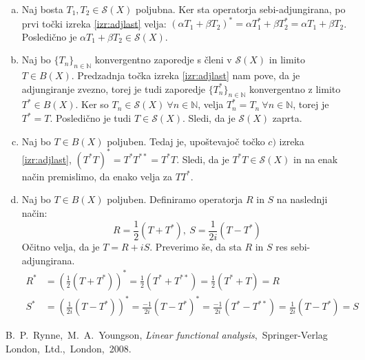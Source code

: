 \documentclass[mat2]{matdelo}
\newcommand{\N}{\mathbb{N}}
\begin{document}
			\begin{dokaz}
				\begin{enumerate}[a)]
					\item Naj bosta $T_1, T_2 \in \mathcal{S}(X)$ poljubna. Ker sta operatorja sebi-adjungirana, po prvi točki izreka \ref{izr:adjlast} velja: $(\alpha T_1 + \beta T_2)^* = \alpha T_1^* + \beta T_2^* = \alpha T_1 + \beta T_2$. Posledično je $\alpha T_1 + \beta T_2 \in \mathcal{S}(X)$.
					\item Naj bo $\{T_n\}_{n\in\N}$ konvergentno zaporedje s členi v $\mathcal{S}(X)$ in limito $T\in B(X)$. Predzadnja točka izreka \ref{izr:adjlast} nam pove, da je adjungiranje zvezno, torej je tudi zaporedje $\{T_n^*\}_{n\in\N}$ konvergentno z limito $T^* \in B(X)$. Ker so $T_n \in \mathcal{S}(X)~ \forall n\in \N$, velja $T_n^* = T_n~\forall n\in \N$, torej je $T^* = T$. Posledično je tudi $T\in \mathcal{S}(X)$. Sledi, da je $\mathcal{S}(X)$ zaprta.
					\item Naj bo $T\in B(X)$ poljuben. Tedaj je, upoštevajoč točko $c)$ izreka \ref{izr:adjlast}, $(T^*T)^* = T^*T^{**} = T^*T$. Sledi, da je $T^*T\in \mathcal{S}(X)$ in na enak način premislimo, da enako velja za $TT^*$.
					\item Naj bo $T\in B(X)$ poljuben. Definiramo operatorja $R$ in $S$ na naslednji način: $$R = \frac{1}{2}(T + T^*),~ S=\frac{1}{2i}(T - T^*)$$
					Očitno velja, da je $T = R + iS$. Preverimo še, da sta $R$ in $S$ res sebi-adjungirana.
					\begin{align*}
						R^* &= (\frac{1}{2}(T + T^*))^* = \frac{1}{2}(T^* + T^{**}) = \frac{1}{2}(T^* + T) = R \\
						S^* &= (\frac{1}{2i}(T - T^*))^* = \frac{-1}{2i}(T - T^*)^* = \frac{-1}{2i}(T^* - T^{**}) =\frac{1}{2i}(T - T^*) = S
					\end{align*}
				\end{enumerate}
			\end{dokaz}
	\begin{thebibliography}{99}
		 B.~P.~Rynne,~M.~A.~Youngson, \emph{Linear functional analysis},~Springer-Verlag London,~Ltd.,~London,~2008.
	\end{thebibliography}
\end{document}
